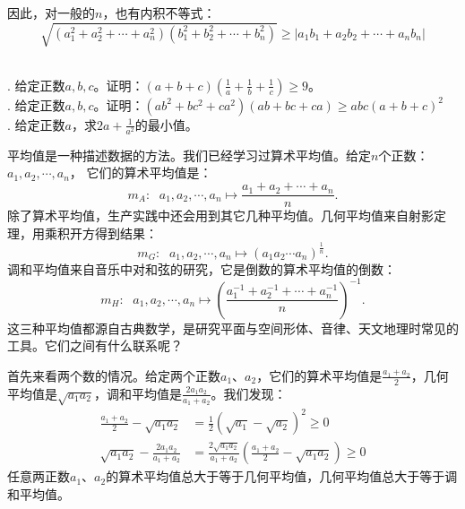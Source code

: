 \documentclass[12pt,UTF8,fontset=none]{ctexbook}
\begin{document}
因此，对一般的$n$，也有内积不等式：
$$ \sqrt{(a_1^2 + a_2^2 + \cdots + a_n^2)(b_1^2 + b_2^2 + \cdots + b_n^2)} \geqslant |a_1b_1 + a_2b_2+ \cdots + a_nb_n|$$

\begin{xt}    
    \mbox{}\\
    . 给定正数$a,b,c$。证明：$(a + b + c)(\frac{1}{a}+\frac{1}{b}+\frac{1}{c}) \geqslant 9$。\\
    . 给定正数$a,b,c$。证明：$(ab^2 + bc^2 + ca^2)(ab + bc + ca) \geqslant abc(a+b+c)^2$ \\
    . 给定正数$a$，求$2a + \frac{1}{a^2}$的最小值。
\end{xt}


平均值是一种描述数据的方法。我们已经学习过算术平均值。给定$n$个正数：$a_1, a_2, \cdots , a_n$，
它们的算术平均值是：
$$ m_A : \;\,\, a_1, a_2, \cdots , a_n \mapsto \frac{a_1 + a_2 + \cdots + a_n}{n}. $$
除了算术平均值，生产实践中还会用到其它几种平均值。几何平均值来自射影定理，用乘积开方得到结果：
$$ m_G :\;\,\, a_1, a_2, \cdots , a_n \mapsto  (a_1a_2\cdots a_n)^{\frac{1}{n}}.$$
调和平均值来自音乐中对和弦的研究，它是倒数的算术平均值的倒数：
$$ m_H : \;\,\, a_1, a_2, \cdots , a_n \mapsto \left(\frac{a_1^{-1} + a_2^{-1} + \cdots + a_n^{-1}}{n}\right)^{-1}. $$
这三种平均值都源自古典数学，是研究平面与空间形体、音律、天文地理时常见的工具。它们之间有什么联系呢？

首先来看两个数的情况。给定两个正数$a_1$、$a_2$，它们的算术平均值是$\frac{a_1 + a_2}{2}$，几何平均值是$\sqrt{a_1a_2}$，调和平均值是$\frac{2a_1a_2}{a_1 + a_2}$。我们发现：
\begin{align*}
    \frac{a_1 + a_2}{2} - \sqrt{a_1a_2} &= \frac{1}{2}(\sqrt{a_1} - \sqrt{a_2})^2 \geqslant 0  \\
    \sqrt{a_1a_2} - \frac{2a_1a_2}{a_1 + a_2} &= \frac{2\sqrt{a_1a_2}}{a_1 + a_2}\left(\frac{a_1 + a_2}{2} - \sqrt{a_1a_2}\right) \geqslant 0 
\end{align*}
任意两正数$a_1$、$a_2$的算术平均值总大于等于几何平均值，几何平均值总大于等于调和平均值。
\end{document}
